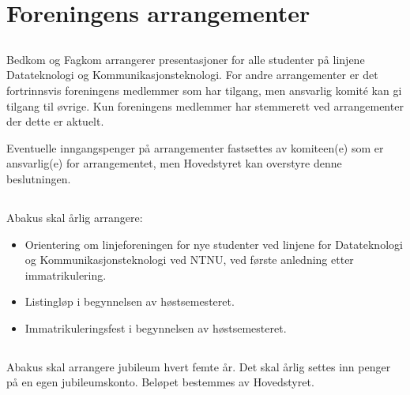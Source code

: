 \section{Foreningens arrangementer}

\subsection{}
Bedkom og Fagkom arrangerer presentasjoner for alle studenter på
linjene Datateknologi og Kommunikasjonsteknologi. For andre arrangementer er
det fortrinnsvis foreningens medlemmer som har tilgang, men ansvarlig komité
kan gi tilgang til øvrige. Kun foreningens medlemmer har stemmerett ved arrangementer der
dette er aktuelt.

Eventuelle inngangspenger på arrangementer fastsettes av komiteen(e) som er
ansvarlig(e) for arrangementet, men Hovedstyret kan overstyre denne
beslutningen.

\subsection{}
Abakus skal årlig arrangere:

\begin{itemize}
  \item Orientering om linjeforeningen for nye studenter ved linjene for
        Datateknologi og Kommunikasjonsteknologi ved NTNU, ved første anledning etter immatrikulering.
  \item Listingløp i begynnelsen av høstsemesteret.
  \item Immatrikuleringsfest i begynnelsen av høstsemesteret.
\end{itemize}

\subsection{}
Abakus skal arrangere jubileum hvert femte år. Det skal årlig settes inn penger
på en egen jubileumskonto. Beløpet bestemmes av Hovedstyret.
